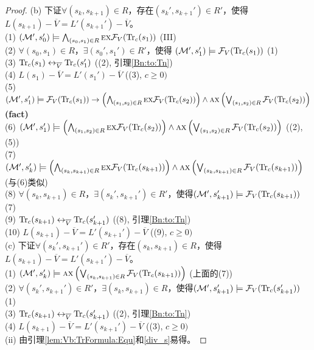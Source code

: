 \begin{proof}
	(b) 下证$\forall (s_k, s_{k+1}) \in R$，存在$(s_k', s_{k+1}') \in R'$，使得$L(s_{k+1}) - \overline V = L'(s_{k+1}') - \overline V$。\\
	(1) $({\cal M}', s_0') \models \bigwedge_{(s_0, s_1) \in R} \textsc{e} \textsc{x} {\cal F}_V(\textrm{Tr}_c(s_1))$  \hfill  (III)\\
	(2) $\forall (s_0, s_1) \in R$，$\exists (s_0', s_1') \in R'$，使得 $({\cal M}', s_1') \models {\cal F}_V(\textrm{Tr}_c(s_1))$  \hfill  (1)\\
	(3) $\textrm{Tr}_c(s_1) \leftrightarrow_{\overline V} \textrm{Tr}_c(s_1')$  \hfill  ((2), 引理\ref{Bn:to:Tn}) \\
	(4) $L(s_1) - \overline V = L'(s_1') - \overline V$  \hfill   ((3), $c \geq 0)$\\
	(5) $({\cal M}', s_1') \models {\cal F}_V(\textrm{Tr}_c(s_1)) \rightarrow \left(\bigwedge_{(s_1,s_2)\in R} \textsc{e} \textsc{x} {\cal F}_V(\textrm{Tr}_c(s_2))\right) \wedge \textsc{a} \textsc{x} \left(\bigvee_{(s_1,s_2)\in R} {\cal F}_V(\textrm{Tr}_c(s_2))\right)$     \hfill  \textbf{(fact)}\\
	(6) $({\cal M}', s_1') \models \left(\bigwedge_{(s_1,s_2)\in R} \textsc{e} \textsc{x} {\cal F}_V(\textrm{Tr}_c(s_2))\right) \wedge \textsc{a} \textsc{x} \left(\bigvee_{(s_1,s_2)\in R} {\cal F}_V(\textrm{Tr}_c(s_2))\right)$ \hfill ((2), (5))\\
	(7) $({\cal M}', s_k') \models \left(\bigwedge_{(s_k,s_{k+1})\in R} \textsc{e} \textsc{x} {\cal F}_V(\textrm{Tr}_c(s_{k+1}))\right) \wedge \textsc{a} \textsc{x} \left(\bigvee_{(s_k,s_{k+1})\in R} {\cal F}_V(\textrm{Tr}_c(s_{k+1}))\right)$       \hfill (与(6)类似)\\
	(8) $\forall (s_k, s_{k+1}) \in R$，$\exists (s_k', s_{k+1}') \in R'$，使得$({\cal M}', s_{k+1}') \models {\cal F}_V(\textrm{Tr}_c(s_{k+1}))$  \hfill  (7)\\
	(9) $\textrm{Tr}_c(s_{k+1}) \leftrightarrow_{\overline V} \textrm{Tr}_c(s_{k+1}')$    \hfill ((8), 引理\ref{Bn:to:Tn}) \\
	(10) $L(s_{k+1}) - \overline V = L'(s_{k+1}') - \overline V$  \hfill   ((9), $c \geq 0)$\\
	
	(c) 下证$\forall (s_k', s_{k+1}') \in R'$，存在$(s_k, s_{k+1})\in R$，使得$L(s_{k+1}) - \overline V = L'(s_{k+1}') - \overline V$。\\
	(1) $({\cal M}', s_k') \models \textsc{a} \textsc{x} \left(\bigvee_{(s_k,s_{k+1})\in R} {\cal F}_V(\textrm{Tr}_c(s_{k+1}))\right)$  \hfill (上面的(7))\\
	(2) $\forall (s_k', s_{k+1}') \in R'$，$\exists (s_k, s_{k+1}) \in R$，使得$({\cal M}', s_{k+1}') \models {\cal F}_V(\textrm{Tr}_c(s_{k+1}'))$  \hfill (1) \\
	(3) $\textrm{Tr}_c(s_{k+1}) \leftrightarrow_{\overline V} \textrm{Tr}_c(s_{k+1}')$    \hfill ((2), 引理\ref{Bn:to:Tn}) \\
	(4) $L(s_{k+1}) - \overline V = L'(s_{k+1}') - \overline V$  \hfill   ((3), $c \geq 0)$\\
	
	(ii) 由引理\ref{lem:Vb:TrFormula:Equ}和\ref{div_s}易得。
	
\end{proof}

